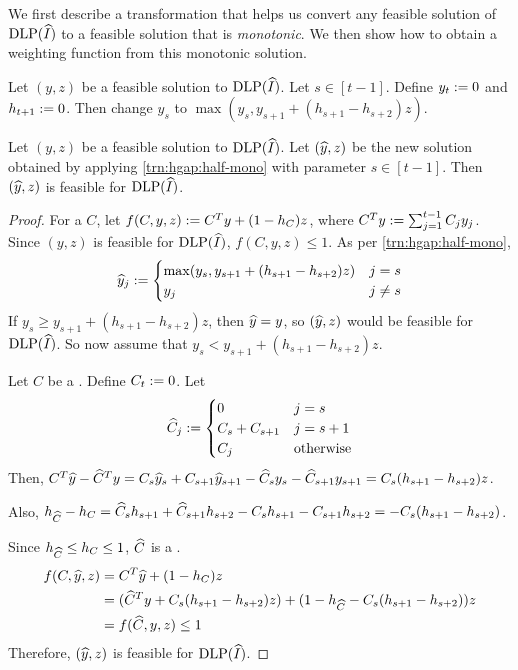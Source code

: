 We first describe a transformation that helps us convert any feasible
solution of $\operatorname{DLP}(\widehat{I})$ to a feasible solution that is \emph{monotonic}.
We then show how to obtain a weighting function from this monotonic solution.

\begin{transformation}
\label{trn:hgap:half-mono}
Let $(y, z)$ be a feasible solution to $\operatorname{DLP}(\widehat{I})$. Let $s \in [t-1]$.
Define $y_t := 0$ and $h_{t+1} := 0$.
Then change $y_s$ to $\max(y_s, y_{s+1} + (h_{s+1} - h_{s+2})z)$.
\end{transformation}
\begin{lemma}
\label{thm:hgap:half-mono-feas}
Let $(y, z)$ be a feasible solution to $\operatorname{DLP}(\widehat{I})$.
Let $(\widehat{y}, z)$ be the new solution obtained by applying \cref{trn:hgap:half-mono}
with parameter $s \in [t-1]$. Then $(\widehat{y}, z)$ is feasible for $\operatorname{DLP}(\widehat{I})$.
\end{lemma}
\begin{proof}
For a \config{} $C$, let $f(C, y, z) := C^Ty + (1-h_C)z$,
where $C^Ty := \sum_{j=1}^{t-1} C_jy_j$.
Since $(y, z)$ is feasible for $\operatorname{DLP}(\widehat{I})$, $f(C, y, z) \le 1$.
As per \cref{trn:hgap:half-mono},
\[ \widehat{y}_j := \begin{cases} \max(y_s, y_{s+1} + (h_{s+1} - h_{s+2})z) & j = s
\\ y_j & j \neq s \end{cases} \]
If $y_s \ge y_{s+1} + (h_{s+1} - h_{s+2})z$, then $\widehat{y} = y$,
so $(\widehat{y}, z)$ would be feasible for $\operatorname{DLP}(\widehat{I})$.
So now assume that $y_s < y_{s+1} + (h_{s+1} - h_{s+2})z$.

Let $C$ be a \config{}. Define $C_t := 0$. Let
\[ \widehat{C}_j := \begin{cases} 0 & j = s \\ C_s + C_{s+1} & j = s+1
\\ C_j & \textrm{otherwise} \end{cases} \]
Then, $C^T\widehat{y} - \widehat{C}^Ty
= C_s\widehat{y}_s + C_{s+1}\widehat{y}_{s+1} - \widehat{C}_sy_s - \widehat{C}_{s+1}y_{s+1}
= C_s(h_{s+1} - h_{s+2}) z$.

Also, $h_{\widehat{C}} - h_C
= \widehat{C}_sh_{s+1} + \widehat{C}_{s+1}h_{s+2} - C_sh_{s+1} - C_{s+1}h_{s+2}
= - C_s(h_{s+1} - h_{s+2})$.

Since $h_{\widehat{C}} \le h_C \le 1$, $\widehat{C}$ is a \config{}.
\begin{align*}
f(C, \widehat{y}, z) &= C^T\widehat{y} + (1-h_C)z
\\ &= (\widehat{C}^Ty + C_s(h_{s+1} - h_{s+2})z)
    + (1 - h_{\widehat{C}} - C_s(h_{s+1} - h_{s+2}))z
\\ &= f(\widehat{C}, y, z) \le 1
\end{align*}
Therefore, $(\widehat{y}, z)$ is feasible for $\operatorname{DLP}(\widehat{I})$.
\end{proof}


